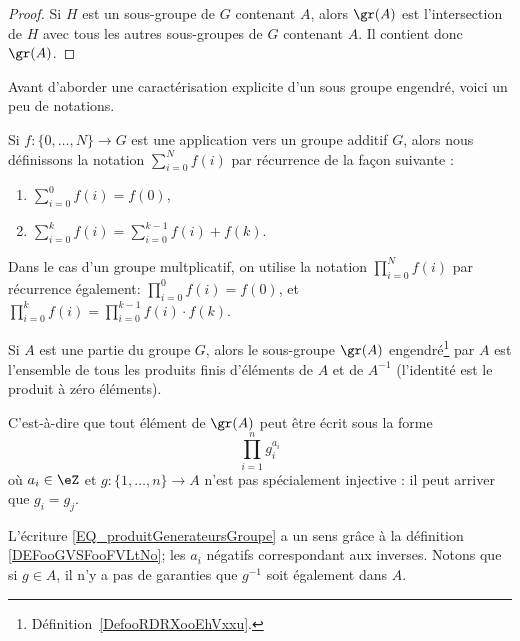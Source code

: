 \begin{proof}
    Si \( H\) est un sous-groupe de \( G\) contenant \( A\), alors \( \gr(A)\) est l'intersection de \( H\) avec tous les autres sous-groupes de \( G\) contenant \( A\). Il contient donc \( \gr(A)\).
\end{proof}

Avant d'aborder une caractérisation explicite d'un sous groupe engendré, voici un peu de notations.
\begin{definition}      \label{DEFooNEVNooJlmJOC}
    Si \( f\colon \{ 0,\ldots, N \}\to G\) est une application vers un groupe additif \( G\), alors nous définissons la notation \( \sum_{i=0}^Nf(i)\) par récurrence de la façon suivante :
    \begin{enumerate}
        \item
            \( \sum_{i=0}^0f(i)=f(0)\),
        \item
            \( \sum_{i=0}^{k}f(i)=\sum_{i=0}^{k-1}f(i)+f(k)\).
    \end{enumerate}
    Dans le cas d'un groupe multplicatif, on utilise la notation \( \prod_{i=0}^N f(i)\) par récurrence également:  \( \prod_{i=0}^0 f(i) = f(0)\), et  \( \prod_{i=0}^{k}f(i)=\prod_{i=0}^{k-1}f(i)\cdot f(k)\).
\end{definition}


\begin{lemma}   \label{LemFUIZooBZTCiy}
    Si \( A\) est une partie du groupe \( G\), alors le sous-groupe \( \gr(A)\) engendré\footnote{Définition~\ref{DefooRDRXooEhVxxu}.} par \( A\) est l'ensemble de tous les produits finis d'éléments de \( A\) et de \( A^{-1}\) (l'identité est le produit à zéro éléments).

    C'est-à-dire que tout élément de \( \gr(A)\) peut être écrit sous la forme
    \begin{equation}\label{EQ_produitGenerateursGroupe}
        \prod_{i=1}^ng_i^{a_i}
    \end{equation}
    où \( a_i\in \eZ\) et \( g\colon\{ 1,\ldots, n \}\to A\) n'est pas spécialement injective : il peut arriver que \( g_i=g_j\).
\end{lemma}
L'écriture \eqref{EQ_produitGenerateursGroupe} a un sens grâce à la définition \ref{DEFooGVSFooFVLtNo}; les \( a_i\) négatifs correspondant aux inverses. Notons que si \( g\in A\), il n'y a pas de garanties que \( g^{-1}\) soit également dans \( A\).

